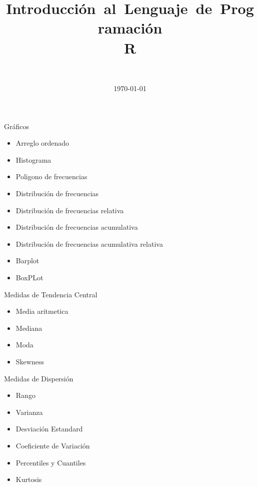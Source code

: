 \documentclass{beamer}
\title[Estad\'istica Descriptiva]
{\mbox{Introducci\'on al Lenguaje de Programaci\'on}\\\mbox{R}}
\author[santosg572@gmail.com]{\nombre \\
{\small \correo}}
\institute[\iniciales]{\instituto}
\date{\today}
\theoremstyle{definition}
\theoremstyle{remark}
\begin{document}
\begin{frame}[label=titlepage]
\titlepage

\end{frame}





\begin{frame}{Gr\'aficos}

\begin{itemize}
\item Arreglo ordenado
\item Histograma
\item Poligono de frecuencias
\item Distribuci\'on de frecuencias
\item Distribuci\'on de frecuencias relativa
\item Distribuci\'on de frecuencias acumulativa
\item Distribuci\'on de frecuencias acumulativa relativa
\item Barplot
\item BoxPLot
\end{itemize} 
\end{frame}


\begin{frame}{Medidas de Tendencia Central}

\begin{itemize}
\item Media aritmetica
\item Mediana
\item Moda
\item Skewness
\end{itemize} 
\end{frame}

\begin{frame}{Medidas de Dispersi\'on}

\begin{itemize}
\item Rango
\item Varianza
\item Desviaci\'on Estandard
\item Coeficiente de Variaci\'on
\item Percentiles y Cuantiles
\item Kurtosis
\end{itemize} 
\end{frame}
\end{document}
